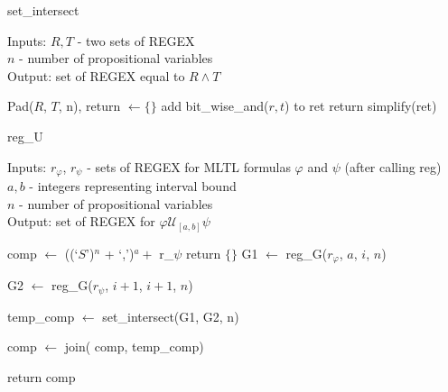 \documentclass[runningheads]{llncs}
\renewcommand{\phi}{\varphi}
\begin{document}
\hfill
\begin{minipage}{0.48\textwidth}
\begin{algorithm}[H]
\caption{set\_intersect}
Inputs: $R, T$ - two sets of REGEX\\
$n$ - number of propositional variables\\
Output: set of REGEX equal to $R \land T$
\begin{algorithmic}[1]
    \State Pad($R$, $T$, n), return $\leftarrow \{\}$
            \State add bit\_wise\_and($r, t$) to ret 
    \EndFor
    \State return simplify(ret)
\EndProcedure
\end{algorithmic}
\end{algorithm}
\vspace{-6.5mm}
\begin{algorithm}[H]
\caption{reg\_U} 
Inputs: $r_\phi$, $r_\psi$ - sets of REGEX for MLTL formulas $\phi$ and $\psi$ (after calling reg)\\
$a, b$ - integers representing interval bound \\
$n$ - number of propositional variables\\
Output: set of REGEX for $\phi \mathcal{U}_{[a, b]} \psi$
\begin{algorithmic}[1]
\Procedure{reg\_U}{$r_\phi$, $r_\psi$, $a$, $b$, $n$} 
    \State comp $\leftarrow$ ((`$S$')$^{n}$ + `,')$^{a} + $ r\_$\psi$
     return $\{\}$
    \EndIf
        \State G1 $\leftarrow$ reg\_G($r_\phi$, $a$, $i$, $n$)
        \State \parbox[t]{.8\linewidth}{G2 $\leftarrow$ reg\_G($r_\psi$, $i+1$, $i+1$, $n$)}
        \State \parbox[t]{.8\linewidth}{temp\_comp $\leftarrow$ set\_intersect(G1,  \hspace*{5mm}G2, n)}
        \State \parbox[t]{.8\linewidth}{comp $\leftarrow$ join( comp, temp\_comp)}
    \EndFor
    \State return comp
\EndProcedure
\end{algorithmic}
\end{algorithm}
\end{minipage}
\end{document}
